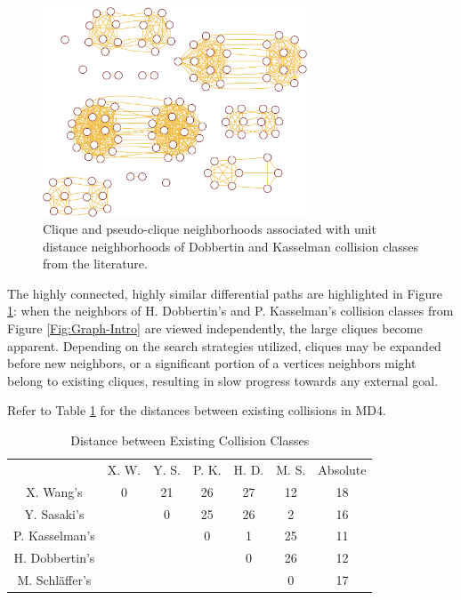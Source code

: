 \documentclass[conference]{IEEEtran}
\begin{document}
\begin{figure}
\begin{center}
\includegraphics[width=0.7\textwidth]{Figs/graph-clique-crop.pdf}
\caption{Clique and pseudo-clique neighborhoods associated with
  unit distance neighborhoods of Dobbertin and Kasselman collision
  classes from the literature.}
\label{Fig:Graph-Clique}
\end{center}
\end{figure}

The highly connected, highly similar differential paths are highlighted in
Figure \ref{Fig:Graph-Clique}: when the neighbors of H. Dobbertin's and
P. Kasselman's collision classes from Figure \ref{Fig:Graph-Intro} are viewed
independently, the large cliques become apparent. Depending on the search
strategies utilized, cliques may be expanded before new neighbors, or a
significant portion of a vertices neighbors might belong to existing cliques,
resulting in slow progress towards any external goal.

Refer to Table \ref{table:distance} for the distances between existing
collisions in MD4.

\begin{table}
    \caption{Distance between Existing Collision Classes}
    \label{table:distance}
    \begin{tabular}{c c c c c c c}
        & X. W. & Y. S. & P. K. & H. D. & M. S. & Absolute \\
        X. Wang's & 0 & 21 & 26 & 27 & 12 & 18 \\
        Y. Sasaki's & & 0 & 25 & 26 & 2 & 16 \\
        P. Kasselman's &  &  & 0 & 1 & 25 & 11 \\
        H. Dobbertin's &  &  &  & 0 & 26 & 12 \\
        M. Schl{\"a}ffer's &  &  &  &  & 0 & 17 \\
    \end{tabular}
\end{table}
\end{document}
